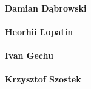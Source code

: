 \paragraph{Damian Dąbrowski}
\paragraph{Heorhii Lopatin}
\paragraph{Ivan Gechu}
\paragraph{Krzysztof Szostek}
